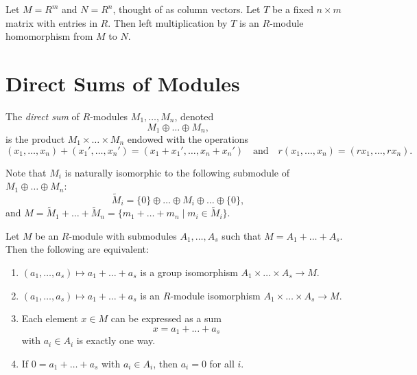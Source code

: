 \begin{example}
  Let $M = R^m$ and $N = R^n$, thought of as column
  vectors. Let $T$ be a fixed $n \times m$ matrix with
  entries in $R$. Then left multiplication by $T$ is an
  $R$-module homomorphism from $M$ to $N$.
\end{example}

\section{Direct Sums of Modules}
\begin{definition}
  The \emph{direct sum} of $R$-modules $M_1, \dots, M_n$,
  denoted
  \[
    M_1 \oplus \dots \oplus M_n,
  \]
  is the product $M_1 \times \dots \times M_n$
  endowed with the operations
  \[
    (x_1, \dots, x_n) + (x_1', \dots, x_n') = (x_1 + x_1', \dots, x_n + x_n')
    \quad \text{and} \quad
    r(x_1, \dots, x_n) = (rx_1, \dots, rx_n).
  \]
\end{definition}

\begin{remark}
  Note that $M_i$ is naturally isomorphic to the
  following submodule of $M_1 \oplus \dots \oplus M_n$:
  \[
    \widetilde{M}_i = \{0\} \oplus \dots \oplus M_i \oplus \dots \oplus \{0\},
  \]
  and $M = \widetilde{M}_1 + \dots + \widetilde{M}_n = \{m_1 + \dots + m_n \mid m_i \in \widetilde{M}_i\}$.
\end{remark}

\begin{prop}
  Let $M$ be an $R$-module with submodules
  $A_1, \dots, A_s$ such that $M = A_1 + \dots + A_s$.
  Then the following are equivalent:
  \begin{enumerate}
    \item $(a_1, \dots, a_s) \mapsto a_1 + \dots + a_s$
      is a group isomorphism
      $A_1 \times \dots \times A_s \to M$.
    \item $(a_1, \dots, a_s) \mapsto a_1 + \dots + a_s$
      is an $R$-module isomorphism
      $A_1 \times \dots \times A_s \to M$.
    \item Each element $x \in M$ can be expressed as a
      sum
      \[
        x = a_1 + \dots + a_s
      \]
      with $a_i \in A_i$ is exactly one way.
    \item If $0 = a_1 + \dots + a_s$ with $a_i \in A_i$,
      then $a_i = 0$ for all $i$.
  \end{enumerate}
\end{prop}

